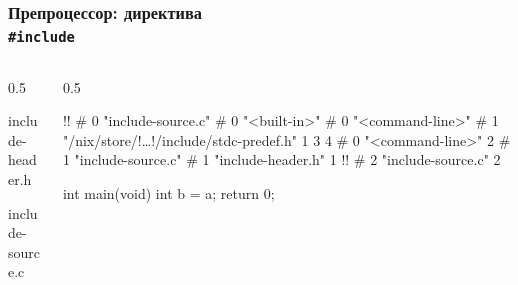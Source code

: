 \documentclass[compress, 8pt, aspectratio=169]{beamer}
\begin{document}
\begin{frame}[fragile]

    \frametitle{Препроцессор: директива \\ \texttt{\#include}}

    \begin{columns}[T]

        \begin{column}{0.5\textwidth}

                {include-header.h}

                {include-source.c}

        \end{column}

        \begin{column}{0.5\textwidth}

            \begin{terminalwindow}
!!
# 0 "include-source.c"
# 0 "<built-in>"
# 0 "<command-line>"
# 1 "/nix/store/!\dots!/include/stdc-predef.h" 1 3 4
# 0 "<command-line>" 2
# 1 "include-source.c"
# 1 "include-header.h" 1
!!
# 2 "include-source.c" 2

int main(void) {
    int b = a;
    return 0;
}
            \end{terminalwindow}

        \end{column}

    \end{columns}

\end{frame}

\end{document}

